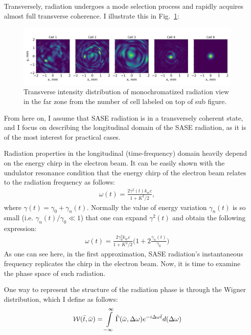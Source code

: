     Transversely, radiation undergoes a mode selection process and rapidly acquires almost full transverse coherence. I illustrate this in Fig.~\ref{Fig:transverse_modes}:
    \begin{figure}[h!]
    	\centering
        \includegraphics[width=0.99\linewidth]{content/images/4_FEL_Theory/transverse_modes.png}
        \captionsetup{justification=centering}
        \caption{Transverse intensity distribution of monochromatized radiation view in the far zone from the number of cell labeled on top of sub figure.}
        \label{Fig:transverse_modes}
    \end{figure} 
    From here on, I assume that SASE radiation is in a transversely coherent state, and I focus on describing the longitudinal domain of the SASE radiation, as it is of the most interest for practical cases.

    Radiation properties in the longitudinal (time-frequency) domain heavily depend on the energy chirp in the electron beam. It can be easily shown with the undulator resonance condition that the energy chirp of the electron beam relates to the radiation frequency as follows:
    \begin{align}
        \omega(t) = \frac{2 \gamma^2(t)k_w c}{1 + K^2/2},
    \end{align}
    where $\gamma(t) = \gamma_0 + \gamma_n(t)$. Normally the value of energy variation $\gamma_n(t)$ is so small (i.e. $\gamma_n(t)/\gamma_0 \ll 1$) that one can expand $\gamma^2(t)$ and obtain the following expression:
    \begin{align}
        \omega(t) = \frac{2\gamma_0^2k_w c}{1 + K^2/2}\bigg(1 + 2\frac{\gamma_n(t)}{\gamma_0}\bigg) 
    \end{align}
    As one can see here, in the first approximation, SASE radiation's instantaneous frequency replicates the chirp in the electron beam. Now, it is time to examine the phase space of such radiation.
    
    One way to represent the structure of the radiation phase is through the Wigner distribution, which I define as follows:
    \begin{align}
        \mathcal{W}(\bar{t}, \bar{\omega}) = \int \limits_{-\infty}^{\infty} \Tilde{\Gamma}(\bar{\omega}, \Delta \omega) e^{-i\Delta \omega \bar{t}}d(\Delta \omega)
    \end{align}

